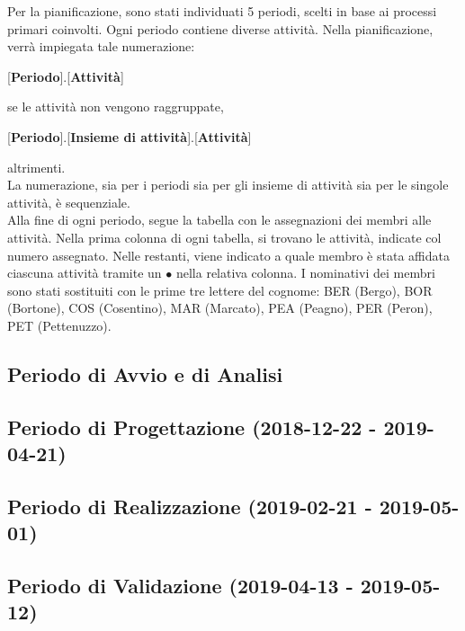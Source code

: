 Per la pianificazione, sono stati individuati 5 periodi, scelti in base ai processi primari coinvolti. Ogni periodo contiene diverse attività. Nella pianificazione, verrà impiegata tale numerazione:
\begin{center}
	[\textbf{Periodo}].[\textbf{Attività}]
\end{center}
se le attività non vengono raggruppate,
\begin{center}
	[\textbf{Periodo}].[\textbf{Insieme di attività}].[\textbf{Attività}]
\end{center}
altrimenti.\\
La numerazione, sia per i periodi sia per gli insieme di attività sia per le singole attività, è sequenziale.\\
Alla fine di ogni periodo, segue la tabella con le assegnazioni dei membri alle attività. Nella prima colonna di ogni tabella, si trovano le attività, indicate col numero assegnato. Nelle restanti, viene indicato a quale membro è stata affidata ciascuna attività tramite un $\bullet$ nella relativa colonna. I nominativi dei membri sono stati sostituiti con le prime tre lettere del cognome: BER (Bergo), BOR (Bortone), COS (Cosentino), MAR (Marcato), PEA (Peagno), PER (Peron), PET (Pettenuzzo).

\newpage
\subsection{Periodo di Avvio e di Analisi}
	

\newpage
\subsection{Periodo di Progettazione (2018-12-22 - 2019-04-21)}	
	
	
\newpage	
\subsection{Periodo di Realizzazione (2019-02-21 - 2019-05-01)}
	
	
\newpage	
\subsection{Periodo di Validazione (2019-04-13 - 2019-05-12)}
	
	
\newpage
